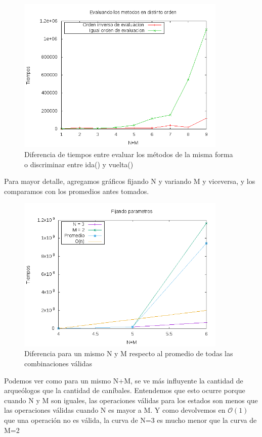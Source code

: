 \begin{figure}[H]
    \centering
    \includegraphics[width=10cm]{./imagenes/tiemposEj1Cambiados.png}
    \caption{Diferencia de tiempos entre evaluar los métodos de la misma forma o discriminar entre ida() y vuelta()}
\end{figure}

Para mayor detalle, agregamos gráficos fijando N y variando M y viceversa, y los comparamos con los promedios antes tomados.

\begin{figure}[H]
    \centering
    \includegraphics[width=10cm]{./imagenes/fijos.png}
    \caption{Diferencia para un mismo N y M respecto al promedio de todas las combinaciones válidas}
\end{figure}

Podemos ver como para un mismo N+M, se ve m\'as influyente la cantidad de arque\'ologos que la cantidad de can\'ibales. Entendemos que esto ocurre porque cuando N y M son iguales, las operaciones v\'alidas para los estados son menos que las operaciones v\'alidas cuando N es mayor a M. Y como devolvemos en $\mathcal{O}(1)$ que una operaci\'on no es v\'alida, la curva de N=3 es mucho menor que la curva de M=2
